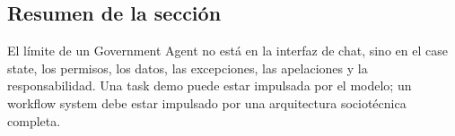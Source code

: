 \subsection{Resumen de la sección}

El límite de un Government Agent no está en la interfaz de chat, sino en el case state, los permisos, los datos, las excepciones, las apelaciones y la responsabilidad. Una task demo puede estar impulsada por el modelo; un workflow system debe estar impulsado por una arquitectura sociotécnica completa.
